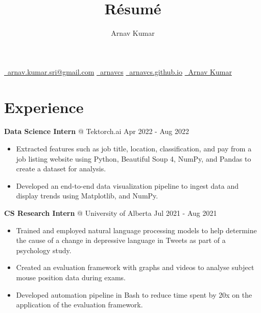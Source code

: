 \documentclass{article}
\makeatletter
\newcommand{\smallbullet}{\,\begin{picture}(-1,1)(-1,-3)\circle*{3}\end{picture}\ }
\renewcommand{\maketitle}{
    \begin{center}
    {\color{MyBlue3}\Huge\bfseries
        \theauthor
    }

    \vspace{0.3em}
    {
        \href{mailto:arnav.kumar.sri@gmail.com}{\faEnvelope \ arnav.kumar.sri@gmail.com} \quad
        \href{https://github.com/arnavcs}{\faGithub \ arnavcs} \quad
        \href{https://arnavcs.github.io/}{\faGlobe \ arnavcs.github.io} \quad
        \href{https://www.linkedin.com/in/arnav-kumar-0644881a3/}{\faLinkedin \ Arnav Kumar}
    }
    \vspace{-1em}
    \end{center}
}
\newenvironment{resumeItem}
{
    \vspace{0.5em}
}
{
}
\newcommand{\experienceHead}[4]{
    \textbf{#1} @ #2 \hfill #3 \\[-1.2em]
}
\newenvironment{resumeList}
{
    \begin{itemize}[label=\smallbullet]
}
{
    \end{itemize}
}
\makeatother
\begin{document}
\title{R\'esum\'e}
\author{Arnav Kumar}

\maketitle


\section{Experience}

\begin{resumeItem}
\experienceHead{Data Science Intern}{Tektorch.ai}{Apr 2022 - Aug 2022}{Online}
\begin{resumeList}
    \item Extracted features such as job title, location, classification, and pay from a job listing website using Python, Beautiful Soup 4, NumPy, and Pandas to create a dataset for analysis. 
    \item Developed an end-to-end data visualization pipeline to ingest data and display trends using Matplotlib, and NumPy.
\end{resumeList}
\end{resumeItem}


\begin{resumeItem}
\experienceHead{CS Research Intern}{University of Alberta}{Jul 2021 - Aug 2021}{Online}
\begin{resumeList}
    \item Trained and employed natural language processing models to help determine the cause of a change in depressive language in Tweets as part of a psychology study.
    \item Created an evaluation framework with graphs and videos to analyse subject mouse position data during exams.
    \item Developed automation pipeline in Bash to reduce time spent by 20x on the application of the evaluation framework.
\end{resumeList}
\end{resumeItem}
\end{document}
